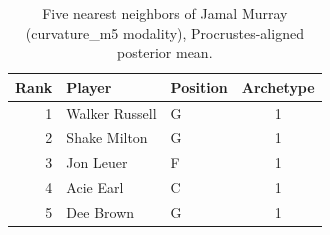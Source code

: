 \begin{table}[htbp]
  \centering\small
  \begin{tabular}{rllc}
    \toprule
    Rank & Player & Position & Archetype \\
    \midrule
    1 & Walker Russell & G & 1 \\
    2 & Shake Milton & G & 1 \\
    3 & Jon Leuer & F & 1 \\
    4 & Acie Earl & C & 1 \\
    5 & Dee Brown & G & 1 \\
    \bottomrule
  \end{tabular}
  \caption{Five nearest neighbors of Jamal Murray (curvature_m5 modality), Procrustes-aligned posterior mean.}
  \label{tab:Jamal_Murray_neighbors_curvature_m5}
\end{table}

